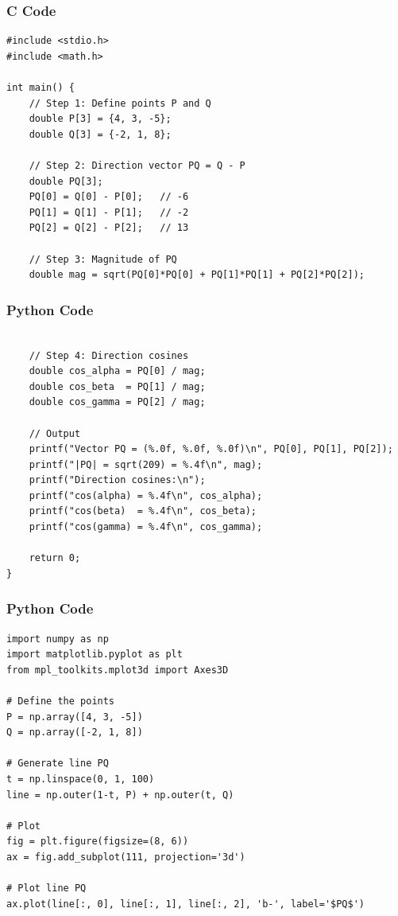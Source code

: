 \documentclass{beamer}
\begin{document}
\begin{frame}[fragile]
    \frametitle{C Code}
    \begin{lstlisting}
#include <stdio.h>
#include <math.h>

int main() {
    // Step 1: Define points P and Q
    double P[3] = {4, 3, -5};
    double Q[3] = {-2, 1, 8};

    // Step 2: Direction vector PQ = Q - P
    double PQ[3];
    PQ[0] = Q[0] - P[0];   // -6
    PQ[1] = Q[1] - P[1];   // -2
    PQ[2] = Q[2] - P[2];   // 13

    // Step 3: Magnitude of PQ
    double mag = sqrt(PQ[0]*PQ[0] + PQ[1]*PQ[1] + PQ[2]*PQ[2]);

    \end{lstlisting}
\end{frame}

\begin{frame}[fragile]
    \frametitle{Python Code}
    \begin{lstlisting}
    
    // Step 4: Direction cosines
    double cos_alpha = PQ[0] / mag;
    double cos_beta  = PQ[1] / mag;
    double cos_gamma = PQ[2] / mag;

    // Output
    printf("Vector PQ = (%.0f, %.0f, %.0f)\n", PQ[0], PQ[1], PQ[2]);
    printf("|PQ| = sqrt(209) = %.4f\n", mag);
    printf("Direction cosines:\n");
    printf("cos(alpha) = %.4f\n", cos_alpha);
    printf("cos(beta)  = %.4f\n", cos_beta);
    printf("cos(gamma) = %.4f\n", cos_gamma);

    return 0;
}

    \end{lstlisting}
\end{frame}

\begin{frame}[fragile]
    \frametitle{Python Code}
    \begin{lstlisting}
import numpy as np
import matplotlib.pyplot as plt
from mpl_toolkits.mplot3d import Axes3D

# Define the points
P = np.array([4, 3, -5])
Q = np.array([-2, 1, 8])

# Generate line PQ
t = np.linspace(0, 1, 100)
line = np.outer(1-t, P) + np.outer(t, Q)

# Plot
fig = plt.figure(figsize=(8, 6))
ax = fig.add_subplot(111, projection='3d')

# Plot line PQ
ax.plot(line[:, 0], line[:, 1], line[:, 2], 'b-', label='$PQ$')

    \end{lstlisting}
\end{frame}
\end{document}
